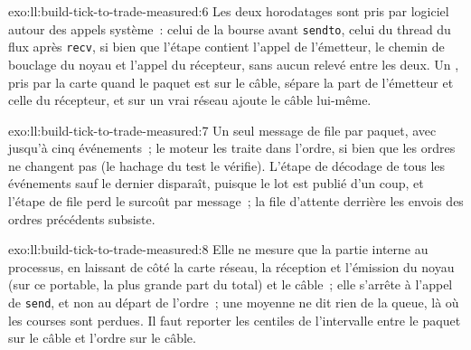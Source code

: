 \begin{solution}{exo:ll:build-tick-to-trade-measured:6}
Les deux horodatages sont pris par logiciel autour des appels système~: celui de la bourse avant \texttt{sendto}, celui du thread du flux après
\texttt{recv}, si bien que l'étape contient l'appel de l'émetteur, le chemin de bouclage du noyau et l'appel du récepteur, sans aucun relevé
entre les deux. Un , pris par la carte quand le paquet est sur le câble, sépare la part de l'émetteur et
celle du récepteur, et sur un vrai réseau ajoute le câble lui-même.
\end{solution}

\begin{solution}{exo:ll:build-tick-to-trade-measured:7}
Un seul message de file par paquet, avec jusqu'à cinq événements~; le moteur les traite dans l'ordre, si bien que les ordres
ne changent pas (le hachage du test le vérifie). L'étape de décodage de tous les événements sauf le dernier disparaît, puisque le lot est publié d'un coup, et l'étape de file
perd le surcoût par message~; la file d'attente derrière les envois des ordres précédents subsiste.
\end{solution}

\begin{solution}{exo:ll:build-tick-to-trade-measured:8}
Elle ne mesure que la partie interne au processus, en laissant de côté la carte réseau, la réception et l'émission du noyau (sur ce portable, la plus grande part
du total) et le câble~; elle s'arrête à l'appel de \texttt{send}, et non au départ de l'ordre~; une moyenne ne dit rien de
la queue, là où les courses sont perdues. Il faut reporter les centiles de l'intervalle entre le paquet sur le câble et l'ordre sur le câble.
\end{solution}

